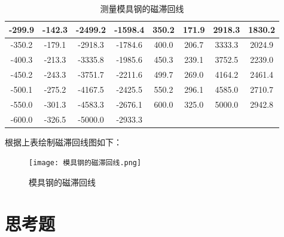 \documentclass[11pt]{article}
\begin{document}
\begin{table}[H]
\begin{tabular}{|c|c|c|c|c|c|c|c|}
    -299.9  & -142.3  & -2499.2  & -1598.4  & 350.2  & 171.9  & 2918.3  & 1830.2  \\ \hline
    -350.2  & -179.1  & -2918.3  & -1784.6  & 400.0  & 206.7  & 3333.3  & 2024.9  \\ \hline
    -400.3  & -213.3  & -3335.8  & -1985.6  & 450.3  & 239.1  & 3752.5  & 2239.0  \\ \hline
    -450.2  & -243.3  & -3751.7  & -2211.6  & 499.7  & 269.0  & 4164.2  & 2461.4  \\ \hline
    -500.1  & -275.2  & -4167.5  & -2425.5  & 550.2  & 296.1  & 4585.0  & 2710.7  \\ \hline
    -550.0  & -301.3  & -4583.3  & -2676.1  & 600.0  & 325.0  & 5000.0  & 2942.8  \\ \hline
    -600.0  & -326.5  & -5000.0  & -2933.3  &       &       &       &  \\ \hline
    \end{tabular}
    \caption{测量模具钢的磁滞回线}
\end{table}

根据上表绘制磁滞回线图如下：

\begin{figure}[H]
    \centering
    \texttt{[image: 模具钢的磁滞回线.png]}
    \caption{模具钢的磁滞回线}
\end{figure}

\section{思考题}
\end{document}
